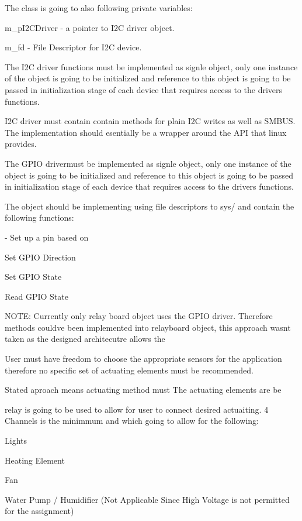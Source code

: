The class is going to also following private variables\+:
\begin{DoxyItemize}
\item m\+\_\+p\+I2\+C\+Driver -\/ a pointer to I2C driver object.
\item m\+\_\+fd -\/ File Descriptor for I2C device.
\end{DoxyItemize}

The I2C driver functions must be implemented as signle object, only one instance of the object is going to be initialized and reference to this object is going to be passed in initialization stage of each device that requires access to the driver\textquotesingle{}s functions.

I2C driver must contain contain methods for plain I2C writes as well as S\+M\+B\+US. The implementation should esentially be a wrapper around the A\+PI that linux provides.

The G\+P\+IO drivermust be implemented as signle object, only one instance of the object is going to be initialized and reference to this object is going to be passed in initialization stage of each device that requires access to the driver\textquotesingle{}s functions.

The object should be implementing using file descriptors to sys/ and contain the following functions\+:
\begin{DoxyItemize}
\item -\/ Set up a pin based on
\item Set G\+P\+IO Direction
\item Set G\+P\+IO State
\item Read G\+P\+IO State
\end{DoxyItemize}

N\+O\+TE\+: Currently only relay board object uses the G\+P\+IO driver. Therefore methods could\textquotesingle{}ve been implemented into relayboard object, this approach wasn\textquotesingle{}t taken as the designed architecutre allows the

User must have freedom to choose the appropriate sensors for the application therefore no specific set of actuating elements must be recommended.

Stated aproach means actuating method must The actuating elements are be

relay is going to be used to allow for user to connect desired actuaiting. 4 Channels is the minimmum and which going to allow for the following\+:
\begin{DoxyItemize}
\item Lights
\item Heating Element
\item Fan
\item Water Pump / Humidifier (Not Applicable Since High Voltage is not permitted for the assignment)
\end{DoxyItemize}

